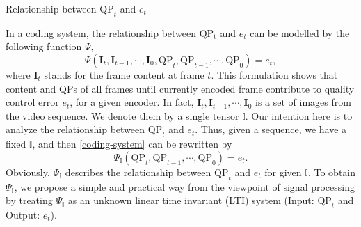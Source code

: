 \documentclass[final]{beamer}
\newlength{\onecolwid}
\newlength{\twocolwid}
\begin{document}
\begin{frame}[t]
\begin{columns}[t]
\begin{column}{\twocolwid}
\begin{columns}[t,totalwidth=\twocolwid]
\begin{column}{\onecolwid}\vspace{-.6in} %


\begin{block}{Relationship between $\mathrm{QP}_{t}$ and $e_t$}

In a coding system, the relationship between $\mathrm{QP_t}$ and $e_t$ can be modelled by the following function $\Psi$,
\begin{equation}
\label{coding-system}
\Psi(\mathbf{I}_{t},\mathbf{I}_{t-1},\cdots,\mathbf{I}_0,\mathrm{QP}_{t},\mathrm{QP}_{t-1},\cdots,\mathrm{QP}_{0})=e_t,
\end{equation}
where $\mathbf{I}_t$ stands for the frame content at frame $t$. This formulation shows that content and $\mathrm{QP}$s of all frames until currently encoded frame contribute to quality control error $e_t$, for a given encoder. In fact, $\mathbf{I}_{t},\mathbf{I}_{t-1},\cdots,\mathbf{I}_0$ is a set of images from the video sequence. We denote them by a single tensor $\mathbb{I}$. Our intention here is to analyze the relationship between $\mathrm{QP}_{t}$ and $e_t$. Thus, given a sequence, we have a fixed $\mathbb{I}$, and then \eqref{coding-system} can be rewritten by
\begin{equation}
\label{coding-system-i-down}
\Psi_\mathbb{I}(\mathrm{QP}_{t},\mathrm{QP}_{t-1},\cdots,\mathrm{QP}_{0})=e_t.
\end{equation}
Obviously, $\Psi_\mathbb{I}$ describes the relationship between $\mathrm{QP}_{t}$ and $e_t$ for given $\mathbb{I}$. To obtain $\Psi_\mathbb{I}$, we propose a simple and practical way from the viewpoint of signal processing by treating $\Psi_\mathbb{I}$ as an unknown linear time invariant (LTI) system (Input: $\mathrm{QP}_{t}$ and Output: $e_t$).


\end{block}
\end{column}
\end{columns}
\end{column}
\end{columns}
\end{frame}
\end{document}
